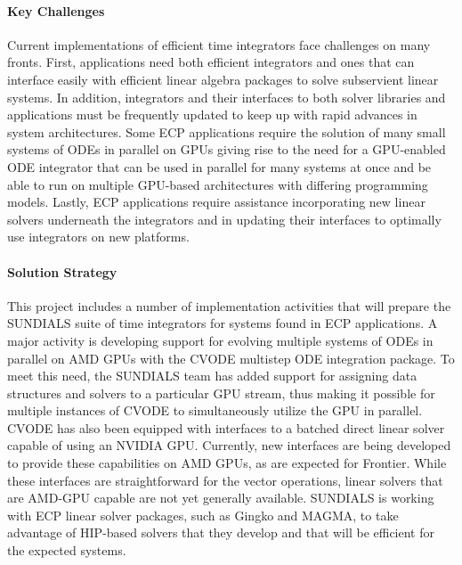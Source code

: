 \paragraph{Key Challenges}

Current implementations of efficient time integrators face challenges on many fronts.
First, applications need both efficient integrators and ones that can interface easily with efficient linear algebra
packages to solve subservient linear systems.  In addition, integrators and their interfaces to both solver libraries
and applications must be frequently updated to keep up with rapid advances in system architectures. Some ECP applications require the solution of many small systems of ODEs in parallel on GPUs giving rise to the need for
a GPU-enabled ODE integrator that can be used in parallel for many systems at once and be able to run on multiple GPU-based architectures with differing programming models. Lastly, ECP applications require assistance incorporating new linear solvers underneath the integrators and in updating their interfaces to optimally use integrators on new platforms.


\paragraph{Solution Strategy}

This project includes a number of implementation activities that will prepare the SUNDIALS suite of time integrators for systems found in ECP applications.  A major activity is developing support for evolving multiple systems of ODEs in parallel on AMD GPUs with the CVODE multistep
ODE integration package.  To meet this need, the SUNDIALS team has added support for assigning data structures and solvers to a particular GPU stream, thus making it possible for multiple instances of CVODE to simultaneously utilize the GPU in parallel.  CVODE has also been equipped with interfaces to a batched direct linear solver capable of using an NVIDIA  GPU.  Currently, new interfaces are being developed to provide these capabilities on AMD GPUs, as are expected for Frontier.  While these interfaces are straightforward for the vector operations, linear solvers that are AMD-GPU capable are not yet generally available.  SUNDIALS is working with ECP linear solver packages, such as Gingko and MAGMA, to take advantage of HIP-based solvers that they develop and that will be efficient for the expected systems.

